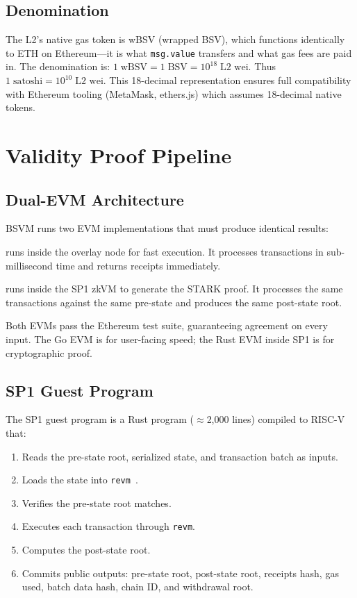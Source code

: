 \documentclass[11pt,twocolumn]{article}
\begin{document}
\subsection{Denomination}

The L2's native gas token is wBSV (wrapped BSV), which functions identically to ETH on Ethereum---it is what \texttt{msg.value} transfers and what gas fees are paid in. The denomination is: $1\;\text{wBSV} = 1\;\text{BSV} = 10^{18}\;\text{L2 wei}$. Thus $1\;\text{satoshi} = 10^{10}\;\text{L2 wei}$. This 18-decimal representation ensures full compatibility with Ethereum tooling (MetaMask, ethers.js) which assumes 18-decimal native tokens.

\section{Validity Proof Pipeline}
\label{sec:proofs}

\subsection{Dual-EVM Architecture}

BSVM runs two EVM implementations that must produce identical results:

\begin{description}[nosep,leftmargin=0em]
\item[Go EVM (geth extraction)] runs inside the overlay node for fast execution. It processes transactions in sub-millisecond time and returns receipts immediately.
\item[Rust EVM (revm inside SP1)] runs inside the SP1 zkVM to generate the STARK proof. It processes the same transactions against the same pre-state and produces the same post-state root.
\end{description}

Both EVMs pass the Ethereum test suite, guaranteeing agreement on every input. The Go EVM is for user-facing speed; the Rust EVM inside SP1 is for cryptographic proof.

\subsection{SP1 Guest Program}

The SP1 guest program is a Rust program ($\approx$2,000 lines) compiled to RISC-V that:

\begin{enumerate}[nosep,leftmargin=1.5em]
\item Reads the pre-state root, serialized state, and transaction batch as inputs.
\item Loads the state into \texttt{revm}~\cite{revm}.
\item Verifies the pre-state root matches.
\item Executes each transaction through \texttt{revm}.
\item Computes the post-state root.
\item Commits public outputs: pre-state root, post-state root, receipts hash, gas used, batch data hash, chain ID, and withdrawal root.
\end{enumerate}
\end{document}
